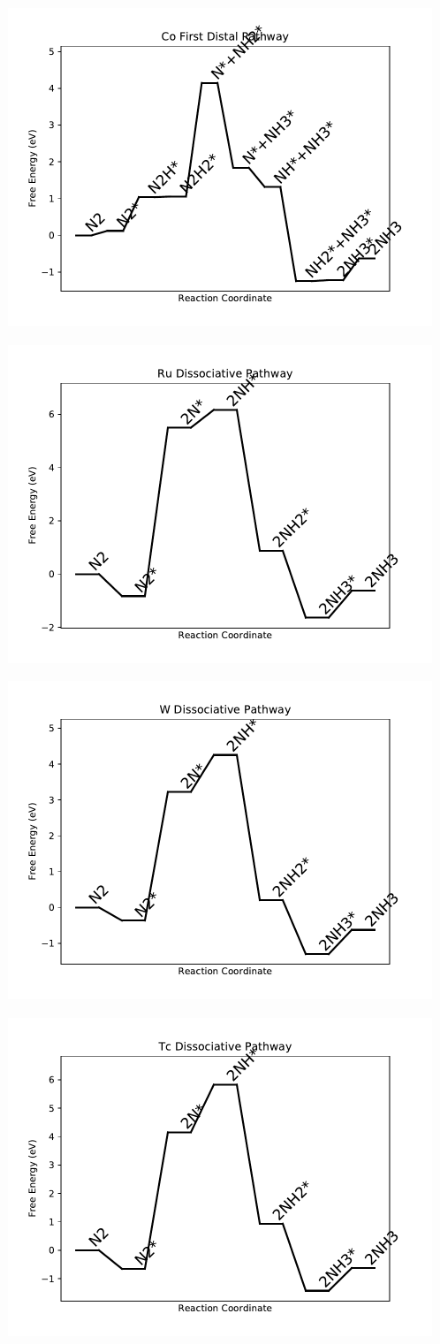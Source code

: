 \documentclass[journal=jacsat,manuscript=article]{achemso}
\begin{document}
\begin{figure}
\includegraphics[width=0.5\linewidth]{data/plots/Co_distal_1.pdf}
\label{fig:Co_distal_1}
\end{figure}

\newpage
\begin{figure}
\includegraphics[width=0.5\linewidth]{data/plots/Ru_dissociative.pdf}
\label{fig:Ru_dissociative}
\end{figure}

\begin{figure}
\includegraphics[width=0.5\linewidth]{data/plots/W_dissociative.pdf}
\label{fig:W_dissociative}
\end{figure}

\newpage
\begin{figure}
\includegraphics[width=0.5\linewidth]{data/plots/Tc_dissociative.pdf}
\label{fig:Tc_dissociative}
\end{figure}
\end{document}
